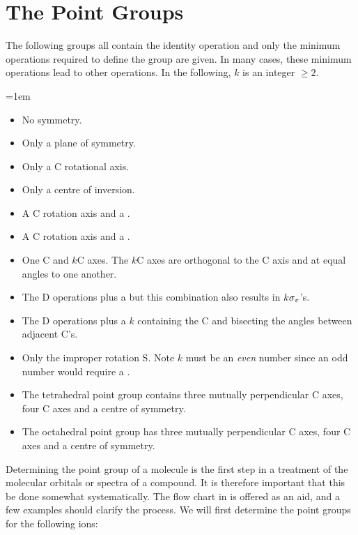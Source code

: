 \section{The Point Groups}

The following groups all contain the identity operation and only the minimum operations required to define the group are given.
In many cases, these minimum operations lead to other operations.
In the following, $k$ is an integer $≥2$.

\begingroup\baselineskip=1em
\begin{itemize}
    \item[\PG{C}{1}] No symmetry.
    \item[\PG{C}{s}] Only a plane of symmetry.
    \item[\PG{C}{k}] Only a \symop[k]C rotational axis.
    \item[\PG{C}{i}] Only a centre of inversion.
    \item[\PG{C}{kh}] A \symop[k]C rotation axis and a \symop[h]{\sigma}.
    \item[\PG{C}{kv}] A \symop[k]C rotation axis and a \symop[v]{\sigma}.
    \item[\PG{D}{k}] One \symop[k]C and $k$\symop[2]C axes. The $k$\symop[2]C axes are orthogonal to the \symop[k]C axis and at equal angles to one another.
    \item[\PG{D}{kh}] The \symop[k]D operations plus a \symop[h]{\sigma} but this combination also results in $k\symop[v]{\sigma}$’s.
    \item[\PG{D}{kd}] The \symop[k]D operations plus a $k$\symop[d]{\sigma} containing the \symop[k]C and bisecting the angles between adjacent \symop[2]C’s.
    \item[\PG{S}{k}] Only the improper rotation \symop[k]S. Note $k$ must be an \emph{even} number since an odd number would require a \symop[h]{\sigma}.
    \item[\PG{T}{d}] The tetrahedral point group contains three mutually perpendicular \symop[2]C axes, four \symop[3]C axes and a centre of symmetry.
    \item[\PG{O}{h}] The octahedral point group has three mutually perpendicular \symop[4]C axes, four \symop[3]C axes and a centre of symmetry.
\end{itemize}
\endgroup

Determining the point group of a molecule is the first step in a treatment of the molecular orbitals or spectra of a compound.
It is therefore important that this be done somewhat systematically.
The flow chart in  is offered as an aid, and a few examples should clarify the process.
We will first determine the point groups for the following  ions:

